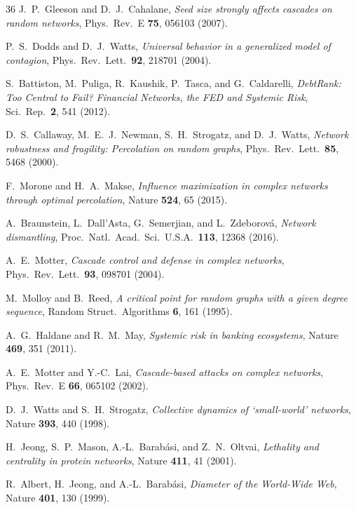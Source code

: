 \documentclass[aps,pre,twocolumn,superscriptaddress,showpacs]{revtex4-2}
\begin{document}
\begin{thebibliography}{36}
J.~P.~Gleeson and D.~J.~Cahalane,
\emph{Seed size strongly affects cascades on random networks},
Phys.\ Rev.\ E \textbf{75}, 056103 (2007).

P.~S.~Dodds and D.~J.~Watts,
\emph{Universal behavior in a generalized model of contagion},
Phys.\ Rev.\ Lett.\ \textbf{92}, 218701 (2004).

S.~Battiston, M.~Puliga, R.~Kaushik, P.~Tasca, and G.~Caldarelli,
\emph{DebtRank: Too Central to Fail? Financial Networks, the FED and Systemic Risk},
Sci.\ Rep.\ \textbf{2}, 541 (2012).

D.~S.~Callaway, M.~E.~J.~Newman, S.~H.~Strogatz, and D.~J.~Watts,
\emph{Network robustness and fragility: Percolation on random graphs},
Phys.\ Rev.\ Lett.\ \textbf{85}, 5468 (2000).

F.~Morone and H.~A.~Makse,
\emph{Influence maximization in complex networks through optimal percolation},
Nature \textbf{524}, 65 (2015).

A.~Braunstein, L.~Dall'Asta, G.~Semerjian, and L.~Zdeborov\'a,
\emph{Network dismantling},
Proc.\ Natl.\ Acad.\ Sci.\ U.S.A.\ \textbf{113}, 12368 (2016).

A.~E.~Motter,
\emph{Cascade control and defense in complex networks},
Phys.\ Rev.\ Lett.\ \textbf{93}, 098701 (2004).

M.~Molloy and B.~Reed,
\emph{A critical point for random graphs with a given degree sequence},
Random Struct.\ Algorithms \textbf{6}, 161 (1995).

A.~G.~Haldane and R.~M.~May,
\emph{Systemic risk in banking ecosystems},
Nature \textbf{469}, 351 (2011).

A.~E.~Motter and Y.-C.~Lai,
\emph{Cascade-based attacks on complex networks},
Phys.\ Rev.\ E \textbf{66}, 065102 (2002).

D.~J.~Watts and S.~H.~Strogatz,
\emph{Collective dynamics of `small-world' networks},
Nature \textbf{393}, 440 (1998).

H.~Jeong, S.~P.~Mason, A.-L.~Barab\'asi, and Z.~N.~Oltvai,
\emph{Lethality and centrality in protein networks},
Nature \textbf{411}, 41 (2001).

R.~Albert, H.~Jeong, and A.-L.~Barab\'asi,
\emph{Diameter of the World-Wide Web},
Nature \textbf{401}, 130 (1999).


\end{thebibliography}
\end{document}
